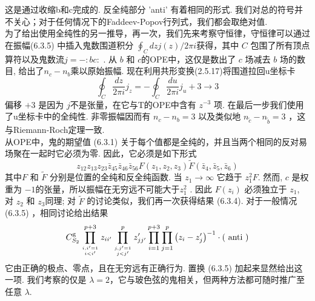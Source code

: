 这是通过收缩b和c完成的. 反全纯部分 'anti' 有着相同的形式. 我们对总的符号并不关心；对于任何情况下的Faddeev-Popov行列式，我们都会取绝对值.\\
为了给出使用全纯性的另一推导，再一次，我们先来考察守恒律，守恒律可以通过在振幅(6.3.5) 中插入鬼数围道积分 $\oint_{C} d z j(z) / 2 \pi i$获得，其中 $C$ 包围了所有顶点算符以及鬼数流$j=-: b c:$ . 从 $b$ 和 $c$的OPE中，这仅是数出了 $c$ 场减去 $b$ 场的数目, 给出了$n_{c}-n_{b}$乘以原始振幅. 现在利用共形变换(2.5.17)将围道拉回u坐标卡
\begin{equation}
	\oint_{C} \frac{d z}{2 \pi i} j_{z}=-\oint_{C} \frac{d u}{2 \pi i} j_{u}+3 \rightarrow 3
\end{equation}
偏移 $+3$ 是因为 $j$不是张量，在它与T的OPE中含有 $z^{-3}$ 项. 在最后一步我们使用了u坐标卡中的全纯性. 非零振幅因而有 $n_{c}-n_{b}=3$ 以及类似地 $n_{\tilde{c}}-n_{\tilde{b}}=3$ ，这与Riemann-Roch定理一致.\\
从OPE中，鬼的期望值 (6.3.1) 关于每个值都是全纯的，并且当两个相同的反对易场聚在一起时它必须为零. 因此，它必须是如下形式
\begin{equation}
	z_{12} z_{13} z_{23} \bar{z}_{45} \bar{z}_{46} \bar{z}_{56} F\left(z_{1}, z_{2}, z_{3}\right) \tilde{F}\left(\bar{z}_{4}, \bar{z}_{5}, \bar{z}_{6}\right)
\end{equation}
其中$F$ 和 $\tilde{F}$ 分别是位置的全纯和反全纯函数. 当 $z_{1} \rightarrow \infty$ 它趋于 $z_{1}^{2} F$. 然而, $c$ 是权重为 $-1$的张量，所以振幅在无穷远不可能大于$z_{1}^{2}$ . 因此 $F\left(z_{i}\right)$ 必须独立于 $z_{1}$, 对 $z_{2}$ 和 $z_{3}$同理; 对 $\tilde{F}$ 的讨论类似，我们再一次获得结果 (6.3.4). 对于一般情况 (6.3.5) ，相同讨论给出结果
\begin{equation}
	C_{S_{2}}^{\mathrm{g}} \prod_{i, i^{\prime}=1 \atop i<i^{\prime}}^{p+3} z_{i i^{\prime}} \prod_{j, j^{\prime}=1 \atop j<j^{\prime}}^{p} z_{j j^{\prime}}^{\prime} \prod_{i=1}^{p+3} \prod_{j=1}^{p}\left(z_{i}-z_{j}^{\prime}\right)^{-1} \cdot(\text { anti })
\end{equation}
它由正确的极点、零点，且在无穷远有正确行为. 置换 (6.3.5) 加起来显然给出这一项. 我们考察的仅是 $\lambda=2$，它与玻色弦的鬼相关，但两种方法都可随时推广至任意 $\lambda$.\\

